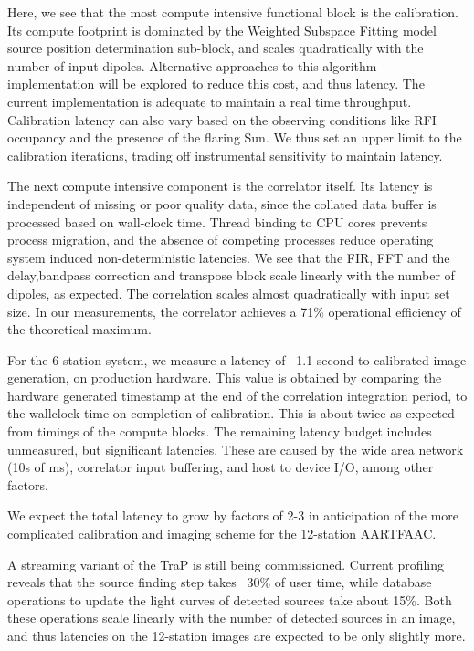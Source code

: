 \documentclass{ws-jai}
\begin{document}
Here,  we  see  that  the  most   compute  intensive  functional  block  is  the
calibration. Its compute footprint is dominated by the Weighted Subspace Fitting
model source position determination sub-block, and scales quadratically with the
number of input dipoles. Alternative approaches to this algorithm implementation
will  be  explored  to  reduce  this   cost,  and  thus  latency.   The  current
implementation  is adequate  to  maintain a  real  time throughput.  Calibration
latency can also  vary based on the observing conditions  like RFI occupancy and
the presence of the  flaring Sun. We thus set an upper  limit to the calibration
iterations, trading off instrumental sensitivity to maintain latency.

The next  compute intensive component is  the correlator itself. Its  latency is
independent of missing  or poor quality data, since the  collated data buffer is
processed based on wall-clock time. Thread binding to CPU cores prevents process
migration,  and  the absence  of  competing  processes reduce  operating  system
induced  non-deterministic  latencies.  We  see   that  the  FIR,  FFT  and  the
delay,bandpass correction and transpose block  scale linearly with the number of
dipoles, as expected. The correlation scales almost quadratically with input set
size.   In  our  measurements,  the   correlator  achieves  a  71\%  operational
efficiency of the theoretical maximum.

For the  6-station system,  we measure  a latency of  ~1.1 second  to calibrated
image generation,  on production hardware.  This value is obtained  by comparing
the  hardware generated  timestamp at  the  end of  the correlation  integration
period, to the wallclock time on  completion of calibration. This is about twice
as expected  from timings of the  compute blocks.  The remaining  latency budget
includes unmeasured,  but significant latencies.   These are caused by  the wide
area network  (10s of ms), correlator  input buffering, and host  to device I/O,
among other factors.

We expect  the total latency to  grow by factors  of 2-3 in anticipation  of the
more complicated calibration and imaging scheme for the 12-station AARTFAAC.

A streaming variant  of the TraP is still being  commissioned. Current profiling
reveals that  the source finding step  takes ~30\% of user  time, while database
operations to update the light curves  of detected sources take about 15\%. Both
these operations scale linearly with the number of detected sources in an image,
and thus  latencies on the  12-station images are  expected to be  only slightly
more.\\
\end{document}
